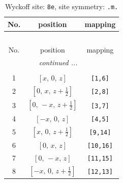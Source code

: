 \documentclass[fleqn,8pt]{jsarticle}
\begin{document}
\renewcommand{\arraystretch}{1.2}
\begin{longtable}{ccc}
\caption{Wyckoff site: {\tt 8e}, site symmetry: {\tt .m.}}
 \\
 \hline \hline
No. & position & mapping \\ \hline \endfirsthead

\multicolumn{2}{l}{\tablename\ \thetable{}} \\
 \hline \hline
No. & position & mapping \\ \hline \endhead

 \hline \hline
\multicolumn{2}{r}{\footnotesize\it continued ...} \\ \endfoot

 \hline \hline
\multicolumn{2}{r}{} \\ \endlastfoot

1 & $\left[ x,\, 0,\, z \right]$ & {\tt [1,6]} \\ \hline
2 & $\left[ 0,\, x,\, z + \frac{1}{2} \right]$ & {\tt [2,8]} \\ \hline
3 & $\left[ 0,\, - x,\, z + \frac{1}{2} \right]$ & {\tt [3,7]} \\ \hline
4 & $\left[ - x,\, 0,\, z \right]$ & {\tt [4,5]} \\ \hline
5 & $\left[ x,\, 0,\, z + \frac{1}{2} \right]$ & {\tt [9,14]} \\ \hline
6 & $\left[ 0,\, x,\, z \right]$ & {\tt [10,16]} \\ \hline
7 & $\left[ 0,\, - x,\, z \right]$ & {\tt [11,15]} \\ \hline
8 & $\left[ - x,\, 0,\, z + \frac{1}{2} \right]$ & {\tt [12,13]} \\
\end{longtable}
\renewcommand{\arraystretch}{1.2}
\end{document}
